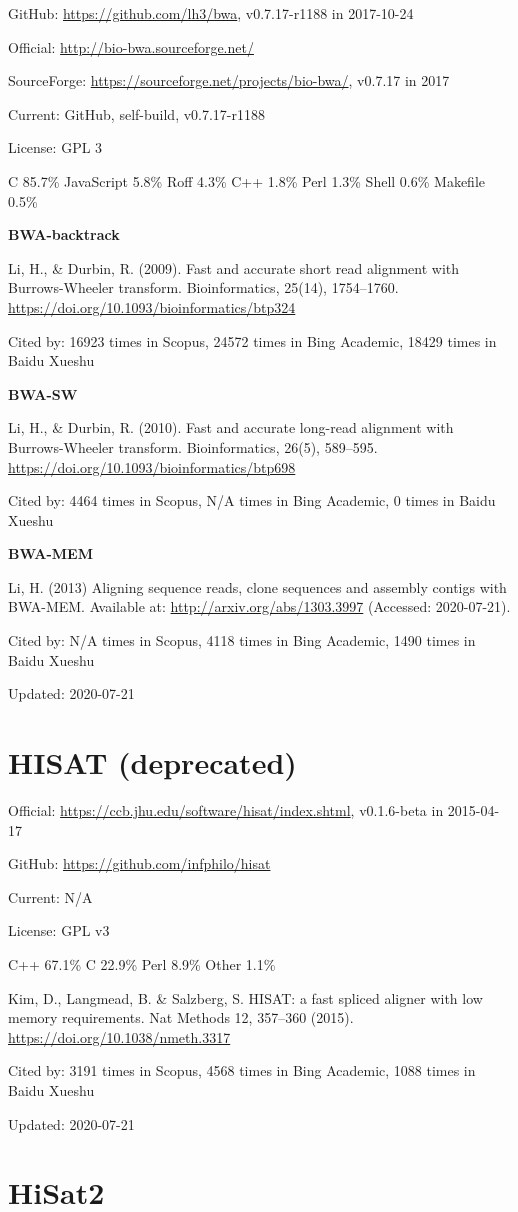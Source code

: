 \documentclass[]{article}
\newcommand{\cb}[3]{\par Cited by: {\color{blue}\Huge #1} times in Scopus, {\color{blue}\Huge #2} times in Bing Academic, {\color{blue}\Huge #3} times in Baidu Xueshu}
\begin{document}
GitHub: \url{https://github.com/lh3/bwa}, v0.7.17-r1188 in 2017-10-24

Official: \url{http://bio-bwa.sourceforge.net/}

SourceForge: \url{https://sourceforge.net/projects/bio-bwa/}, v0.7.17 in 2017

Current: GitHub, self-build, v0.7.17-r1188

License: GPL 3

C 85.7\% JavaScript 5.8\% Roff 4.3\% C++ 1.8\% Perl 1.3\% Shell 0.6\% Makefile 0.5\%

\textbf{BWA-backtrack}

Li, H., \& Durbin, R. (2009). Fast and accurate short read alignment with Burrows-Wheeler transform. Bioinformatics, 25(14), 1754–1760. \url{https://doi.org/10.1093/bioinformatics/btp324}\cb{16923}{24572}{18429}

\textbf{BWA-SW}

Li, H., \& Durbin, R. (2010). Fast and accurate long-read alignment with Burrows-Wheeler transform. Bioinformatics, 26(5), 589–595. \url{https://doi.org/10.1093/bioinformatics/btp698}\cb{4464}{N/A}{0}

\textbf{BWA-MEM}

Li, H. (2013) Aligning sequence reads, clone sequences and assembly contigs with BWA-MEM. Available at: \url{http://arxiv.org/abs/1303.3997} (Accessed: 2020-07-21).\cb{N/A}{4118}{1490}

Updated: 2020-07-21

\section{HISAT (deprecated)}

Official: \url{https://ccb.jhu.edu/software/hisat/index.shtml}, v0.1.6-beta in 2015-04-17

GitHub: \url{https://github.com/infphilo/hisat}

Current: N/A

License: GPL v3

C++ 67.1\% C 22.9\% Perl 8.9\% Other 1.1\%

Kim, D., Langmead, B. \& Salzberg, S. HISAT: a fast spliced aligner with low memory requirements. Nat Methods 12, 357–360 (2015). \url{https://doi.org/10.1038/nmeth.3317}\cb{3191}{4568}{1088}

Updated: 2020-07-21

\section{HiSat2}
\end{document}
